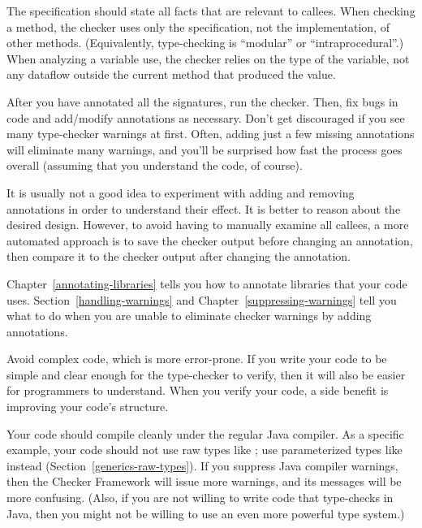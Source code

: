The specification should state all facts that are relevant to callees.
When checking a method, the checker uses only the specification, not the
implementation, of other methods.  (Equivalently, type-checking is
``modular'' or ``intraprocedural''.)  When analyzing a variable use, the
checker relies on the type of the variable, not any dataflow outside the
current method that produced the value.

After you have annotated all the signatures, run the checker.
Then, fix bugs in code and add/modify annotations as necessary.
Don't get discouraged if you see many type-checker warnings at first.
Often, adding just a few missing annotations will eliminate many warnings,
and you'll be surprised how fast the process goes overall (assuming that
you understand the code, of course).

It is usually not a good idea to experiment with adding and removing
annotations in order to understand their effect.  It is better to reason
about the desired design.  However, to avoid having to manually examine all
callees, a more automated approach is to save the checker output before
changing an annotation, then compare it to the checker output after
changing the annotation.

Chapter~\ref{annotating-libraries} tells you how to annotate libraries that
your code uses.  Section~\ref{handling-warnings} and
Chapter~\ref{suppressing-warnings} tell you what to do when you are unable
to eliminate checker warnings by adding annotations.



Avoid complex code, which is more error-prone.  If you write your code to
be simple and clear enough for the type-checker to verify, then it will
also be easier for programmers to understand.  When you verify your code, a
side benefit is improving your code's structure.

Your code should compile cleanly under the regular Java compiler.  As a
specific example, your code should not use raw types like ; use
parameterized types like  instead
(Section~\ref{generics-raw-types}).  If you suppress Java compiler
warnings, then the Checker Framework will issue more warnings, and its
messages will be more confusing.  (Also, if you are not willing to write
code that type-checks in Java, then you might not be willing to use an even
more powerful type system.)

